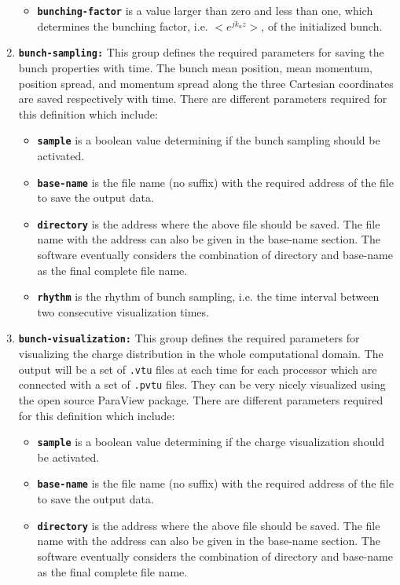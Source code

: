 \begin{enumerate}
\begin{itemize}
\item \textbf{\texttt{bunching-factor}} is a value larger than zero and less than one, which determines the bunching factor, i.e. $<e^{jk_uz}>$, of the initialized bunch.
\end{itemize}
\item \textbf{\texttt{bunch-sampling:}} This group defines the required parameters for saving the bunch properties with time. The bunch mean position, mean momentum, position spread, and momentum spread along the three Cartesian coordinates are saved respectively with time. There are different parameters required for this definition which include:
\begin{itemize}
	\item \textbf{\texttt{sample}} is a boolean value determining if the bunch sampling should be activated.
	\item \textbf{\texttt{base-name}} is the file name (no suffix) with the required address of the file to save the output data.
	\item \textbf{\texttt{directory}} is the address where the above file should be saved. The file name with the address can also be given in the base-name section. The software eventually considers the combination of directory and base-name as the final complete file name.
	\item \textbf{\texttt{rhythm}} is the rhythm of bunch sampling, i.e. the time interval between two consecutive visualization times.
\end{itemize}
\item \textbf{\texttt{bunch-visualization:}} This group defines the required parameters for visualizing the charge distribution in the whole computational domain. The output will be a set of \texttt{.vtu} files at each time for each processor which are connected with a set of \texttt{.pvtu} files. They can be very nicely visualized using the open source ParaView package. There are different parameters required for this definition which include:
\begin{itemize}
	\item \textbf{\texttt{sample}} is a boolean value determining if the charge visualization should be activated.
	\item \textbf{\texttt{base-name}} is the file name (no suffix) with the required address of the file to save the output data.
	\item \textbf{\texttt{directory}} is the address where the above file should be saved. The file name with the address can also be given in the base-name section. The software eventually considers the combination of directory and base-name as the final complete file name.

\end{itemize}
\end{enumerate}
